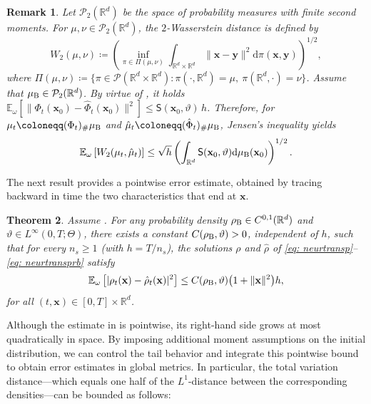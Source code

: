\documentclass[twoside,11pt]{article}
\theoremstyle{plain}
\newtheorem{theorem}{Theorem}[section]
\newtheorem{remark}[theorem]{Remark}
\def\R{\mathbb R}
\def\E{\mathbb E}
\newcommand{\diff}{\mathrm{d}}
\newcommand{\bfx}{\mathbf{x}}
\newcommand{\bfy}{\mathbf{y}}
\begin{document}
\begin{remark}\label{rem:W2}
Let $\mathcal{P}_2(\R^d)$ be the space of probability measures with finite second moments. For $\mu,\nu\in\mathcal{P}_2(\R^d)$, the $2$-Wasserstein distance is defined by
\begin{equation*}
W_2(\mu,\nu)\coloneqq\left(\inf_{\pi\in\Pi(\mu,\nu)}\int_{\R^d\times\R^d}\|\bfx-\bfy\|^2\diff\pi(\bfx,\bfy)\right)^{1/2},
\end{equation*}
where $\Pi(\mu,\nu)\coloneqq\{\pi\in\mathcal{P}(\R^d\times\R^d): \pi(\cdot,\R^d)=\mu,\ \pi(\R^d,\cdot)=\nu\}$. Assume that $\mu_{\rm B}\in\mathcal{P}_2(\R^d)$. By virtue of , it holds $\E_{\omega}[\|\Phi_t(\bfx_0)-\hat\Phi_t(\bfx_0)\|^2]\le \mathsf{S}(\bfx_0,\vartheta)\, h$. Therefore, for $\mu_t\coloneqq(\Phi_t)_{\#}\mu_{\rm B}$ and $\hat\mu_t\coloneqq(\hat\Phi_t)_{\#}\mu_{\rm B}$, Jensen's inequality yields
\begin{equation*}
\E_{\omega}\left[W_2(\mu_t,\hat\mu_t)\right] \le \sqrt{h}\left(\int _{\R^d}\mathsf{S}(\bfx_0,\vartheta)\diff\mu_{\rm B}(\bfx_0)\right)^{1/2}.
\end{equation*}
\end{remark}

The next result provides a pointwise error estimate, obtained by tracing backward in time the two characteristics that end at $\bfx$.

\begin{theorem}\label{thm:transport} 
Assume . For any probability density $\rho_{\rm B}\in {C}^{0,1}(\R^d)$ and $\vartheta\in L^\infty(0,T;\Theta)$, there exists a constant $C(\rho_{\rm B},\vartheta)>0$, independent of $h$, such that for every $n_s\ge1$ (with $h=T/n_s$), the solutions $\rho$ and $\hat \rho$ of \eqref{eq: neurtransp}--\eqref{eq: neurtransprb} satisfy
\begin{align}\label{eq: boundrho}
 \E_{\omega}\left[ |\rho_t(\bfx)-\hat{\rho}_t(\bfx)|^2 \right] \leq C(\rho_{\rm B},\vartheta)\big(1+\|\bfx\|^2\big)h,
\end{align}
for all $(t,\bfx)\in[0,T]\times\R^d$. 
\end{theorem}

Although the estimate in  is pointwise, its right-hand side grows at most quadratically in space. By imposing additional moment assumptions on the initial distribution, we can control the tail behavior and integrate this pointwise bound to obtain error estimates in global metrics. In particular, the total variation distance---which equals one half of the $L^1$-distance between the corresponding densities---can be bounded as follows:
\end{document}
